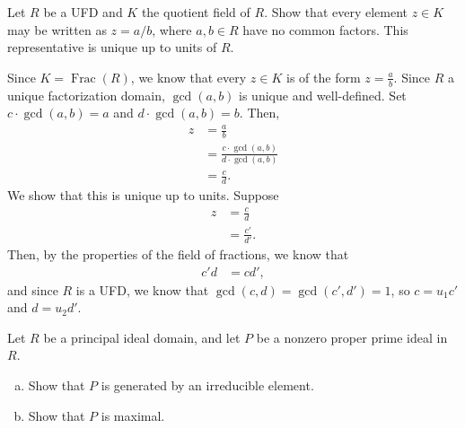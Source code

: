 \documentclass[10pt]{mypackage}
\begin{document}
\begin{exercise}[Exercise 1.2]
  Let $R$ be a UFD and $K$ the quotient field of $R$. Show that every element $z\in K$ may be written as $z = a/b$, where $a,b\in R$ have no common factors. This representative is unique up to units of $R$.
\end{exercise}
\begin{solution}
  Since $K = \operatorname{Frac}\left(R\right)$, we know that every $z\in K$ is of the form $z = \frac{a}{b}$. Since $R$ a unique factorization domain, $\gcd\left(a,b\right)$ is unique and well-defined. Set $c\cdot \gcd\left(a,b\right) = a$ and $d\cdot \gcd\left(a,b\right) = b$. Then,
  \begin{align*}
    z &= \frac{a}{b}\\
      &= \frac{c\cdot \gcd\left(a,b\right)}{d\cdot \gcd\left(a,b\right)}\\
      &= \frac{c}{d}.
  \end{align*}
  We show that this is unique up to units. Suppose
  \begin{align*}
    z &= \frac{c}{d}\\
      &= \frac{c'}{d'}.
  \end{align*}
  Then, by the properties of the field of fractions, we know that
  \begin{align*}
    c'd &= cd',
  \end{align*}
  and since $R$ is a UFD, we know that $\gcd\left(c,d\right) = \gcd\left(c',d'\right) = 1$, so $c = u_1c'$ and $d = u_2d'$.
\end{solution}
\begin{exercise}[Exercise 1.3]
  Let $R$ be a principal ideal domain, and let $P$ be a nonzero proper prime ideal in $R$.
  \begin{enumerate}[(a)]
    \item Show that $P$ is generated by an irreducible element.
    \item Show that $P$ is maximal.
  \end{enumerate}
\end{exercise}
\end{document}
